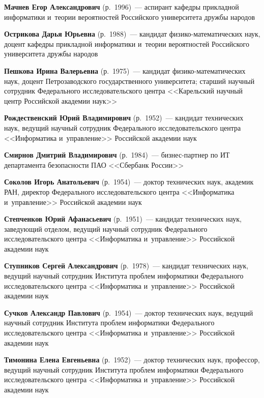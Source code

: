 \begin{multicols}{2}
\noindent
\textbf{Мачнев Егор Александрович} (р.\ 1996)~--- 
аспирант ка\-фед\-ры при\-клад\-ной информатики и~тео\-рии вероятностей Российского университета друж\-бы народов

\noindent
\textbf{Острикова Дарья Юрьевна} (р.\ 1988)~--- кандидат фи\-зи\-ко-ма\-те\-ма\-ти\-че\-ских наук, 
доцент ка\-фед\-ры при\-клад\-ной информатики и~тео\-рии вероятностей Российского университета друж\-бы народов

\noindent
\textbf{Пешкова Ирина Валерьевна} (р.\ 1975)~--- кандидат фи\-зи\-ко-ма\-те\-ма\-ти\-че\-ских наук,
доцент Петрозаводского государственного университета; старший научный со\-труд\-ник
 Федерального исследовательского цент\-ра <<Карельский научный центр Российской академии наук>>


\noindent
\textbf{Рождественский Юрий Владимирович} (р.\ 1952)~--- 
кандидат технических наук, ведущий научный сотрудник Федерального исследовательского цент\-ра <<Информатика 
и~управ\-ле\-ние>> Российской академии наук
 
\noindent
\textbf{Смирнов Дмитрий Владимирович} (р.\ 1984)~--- биз\-нес-парт\-нер по ИТ департамента безопасности ПАО <<Сбербанк России>>

\noindent
\textbf{Соколов Игорь Анатольевич} (р.\ 1954)~--- 
доктор технических наук, академик РАН, директор Федерального исследовательского цент\-ра <<Информатика и~управ\-ле\-ние>> Российской академии наук 

\noindent
\textbf{Степченков Юрий Афанасьевич} (р.\ 1951)~--- кандидат технических наук, заведующий отделом, 
ведущий научный сотрудник Федерального исследовательского цент\-ра <<Информатика и~управ\-ле\-ние>> Российской академии наук


\noindent
\textbf{Ступников Сергей Александрович} (р.\ 1978)~--- 
кандидат технических наук, ведущий научный сотрудник Института проб\-лем информатики Федерального исследовательского цент\-ра 
<<Информатика и~управ\-ле\-ние>> Российской академии наук

\noindent
\textbf{Сучков Александр Павлович} (р.\ 1954)~--- доктор технических наук, 
ведущий научный сотрудник Института проблем информатики Федерального 
\mbox{исследовательского} центра <<Информатика и~управ\-ле\-ние>> Российской академии наук

 \vspace*{2pt}

\noindent
\textbf{Тимонина Елена Евгеньевна} (р.\ 1952)~--- 
доктор технических наук, профессор, ведущий научный \mbox{сотрудник} Института проб\-лем информатики Федерального исследовательского цент\-ра 
<<Информатика и~управ\-ле\-ние>> Российской академии наук


\end{multicols}
